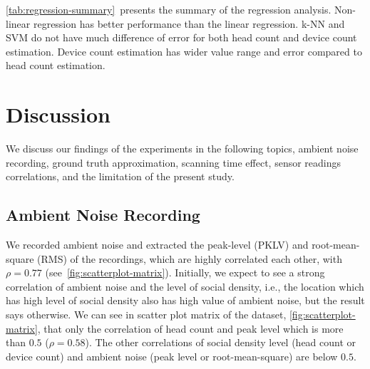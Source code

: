 \autoref{tab:regression-summary}~presents the summary of the regression analysis. Non-linear regression has better performance than the linear regression. \ac{k-NN} and \ac{SVM} do not have much difference of error for both head count and device count estimation. Device count estimation has wider value range and error compared to head count estimation.










\section{Discussion} %
\label{sec:discussion}
We discuss our findings of the experiments in the following topics, ambient noise recording, ground truth approximation, scanning time effect, sensor readings correlations, and the limitation of the present study.

	\subsection{Ambient Noise Recording} %
	\label{sub:ambient_noise_recording}
	We recorded ambient noise and extracted the peak-level (\ac{PKLV}) and root-mean-square (\ac{RMS}) of the recordings, which are highly correlated each other, with $\rho=0.77$ (see~\autoref{fig:scatterplot-matrix}). Initially, we expect to see a strong correlation of ambient noise and the level of social density, i.e., the location which has high level of social density also has high value of ambient noise, but the result says otherwise. We can see in scatter plot matrix of the dataset, \autoref{fig:scatterplot-matrix}, that only the correlation of head count and peak level which is more than $0.5$ ($\rho=0.58$). The other correlations of social density level (head count or device count) and ambient noise (peak level or root-mean-square) are below $0.5$.


